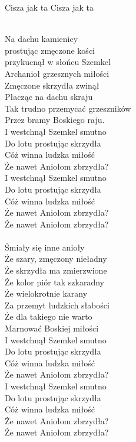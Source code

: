 {Cisza jak ta}
{Cisza jak ta}
\begin{text}
\vin \\
Na dachu kamienicy\\
prostując zmęczone kości\\
przykucnął w słońcu Szemkel\\
Archanioł grzesznych miłości\\

Zmęczone skrzydła zwinął\\
Płacząc na dachu skraju\\
Tak trudno przemycać grzeszników\\
Przez bramy Boskiego raju.\\

\vin I westchnął Szemkel smutno\\
\vin Do lotu prostując skrzydła\\
\vin Cóż winna ludzka miłość\\
\vin Że nawet Aniołom zbrzydła?\\

\vin I westchnął Szemkel smutno\\
\vin Do lotu prostując skrzydła\\
\vin Cóż winna ludzka miłość\\
\vin Że nawet Aniołom zbrzydła?\\
\vin Że nawet Aniołom zbrzydła?\\
\vin \\

Śmiały się inne anioły\\
Że szary, zmęczony nieładny\\
Że skrzydła ma zmierzwione\\
Że kolor piór tak szkaradny\\

Że wielokrotnie karany\\
Za przemyt ludzkich słabości\\
Że dla takiego nie warto\\
Marnować Boskiej miłości\\

\vin I westchnął Szemkel smutno\\
\vin Do lotu prostując skrzydła\\
\vin Cóż winna ludzka miłość\\
\vin Że nawet Aniołom zbrzydła?\\

\vin I westchnął Szemkel smutno\\
\vin Do lotu prostując skrzydła\\
\vin Cóż winna ludzka miłość\\
\vin Że nawet Aniołom zbrzydła?\\
\vin Że nawet Aniołom zbrzydła? \\


\end{text}
